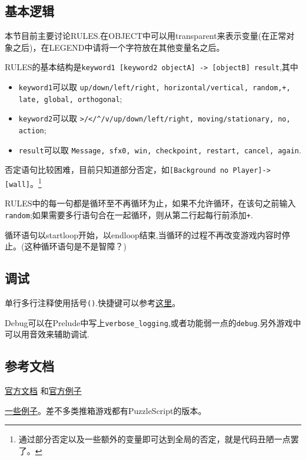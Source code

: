 \documentclass[11pt]{amsart}
\begin{document}
\subsection{基本逻辑}
本节目前主要讨论RULES.在OBJECT中可以用transparent来表示变量(在正常对象之后)，在LEGEND中请将一个字符放在其他变量名之后。

RULES的基本结构是\lstinline|keyword1 [keyword2 objectA] -> [objectB] result|,其中
\begin{itemize}
\item \lstinline|keyword1|可以取 \lstinline|up/down/left/right, horizontal/vertical, random,+, late, global, orthogonal|;
\item \lstinline|keyword2|可以取 \lstinline|>/</^/v/up/down/left/right, moving/stationary, no, action|;
\item \lstinline|result|可以取 \lstinline|Message, sfx0, win, checkpoint, restart, cancel, again|.
\end{itemize}
   

否定语句比较困难，目前只知道部分否定，如\lstinline|[Background no Player]->[wall]|。\footnote{通过部分否定以及一些额外的变量即可达到全局的否定，就是代码丑陋一点罢了。}

RULES中的每一句都是循环至不再循环为止，如果不允许循环，在该句之前输入\lstinline|random|;如果需要多行语句合在一起循环，则从第二行起每行前添加\lstinline|+|.

循环语句以startloop开始，以endloop结束,当循环的过程不再改变游戏内容时停止。(这种循环语句是不是智障？)
\subsection{调试}
单行多行注释使用括号\lstinline|()|.快捷键可以参考\href{https://pancelor.com/PuzzleScript/Documentation/keyboard_shortcuts.html}{这里}。

Debug可以在Prelude中写上\lstinline|verbose_logging|,或者功能弱一点的\lstinline|debug|.另外游戏中可以用音效来辅助调试.
\subsection{参考文档}
\href{https://www.puzzlescript.net/Documentation/documentation.html}{官方文档}
和\href{https://www.puzzlescript.net/Gallery/index.html}{官方例子}

\href{https://erich-friedman.github.io/published/interactive.html}{一些例子}。差不多类推箱游戏都有PuzzleScript的版本。
\end{document}

